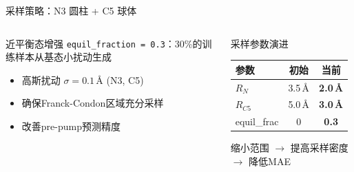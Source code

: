 \documentclass[aspectratio=169,9pt]{beamer}
\newcommand{\AAng}{\,\text{\AA}}
\begin{document}
\begin{frame}{采样策略：N3 圆柱 + C5 球体}
\begin{columns}[T]
    \begin{exampleblock}{近平衡态增强}
      \scriptsize
      \texttt{equil\_fraction = 0.3}：30\%的训练样本从基态小扰动生成

      \begin{itemize}
        \item 高斯扰动 $\sigma = 0.1\AAng$ (N3, C5)
        \item 确保Franck-Condon区域充分采样
        \item 改善pre-pump预测精度
      \end{itemize}
    \end{exampleblock}

    \begin{block}{采样参数演进}
      \scriptsize
      \renewcommand{\arraystretch}{1.05}
      \begin{tabular}{@{}lcc@{}}
        \toprule
        参数 & 初始 & 当前 \\
        \midrule
        $R_N$ & 3.5\,\AA & \textbf{2.0\,\AA} \\
        $R_{C5}$ & 5.0\,\AA & \textbf{3.0\,\AA} \\
        equil\_frac & 0 & \textbf{0.3} \\
        \bottomrule
      \end{tabular}

      缩小范围 $\to$ 提高采样密度 $\to$ 降低MAE
    \end{block}
  \end{columns}
\end{frame}
\end{document}
